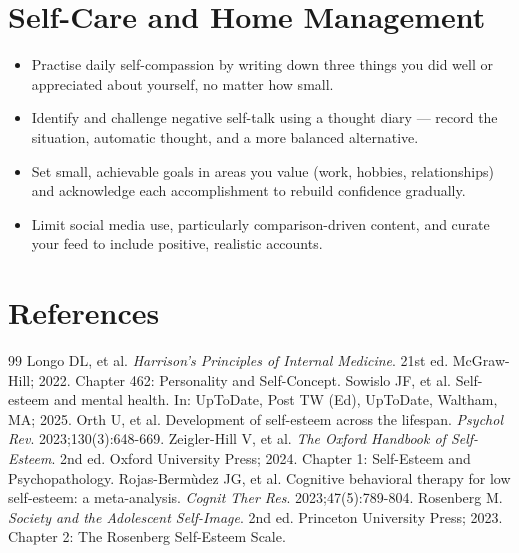\section*{Self-Care and Home Management}
\begin{itemize}
  \item Practise daily self-compassion by writing down three things you did well or appreciated about yourself, no matter how small.
  \item Identify and challenge negative self-talk using a thought diary — record the situation, automatic thought, and a more balanced alternative.
  \item Set small, achievable goals in areas you value (work, hobbies, relationships) and acknowledge each accomplishment to rebuild confidence gradually.
  \item Limit social media use, particularly comparison-driven content, and curate your feed to include positive, realistic accounts.
\end{itemize}

\section*{References}

\begin{thebibliography}{99}
 Longo DL, et al. \emph{Harrison's Principles of Internal Medicine}. 21st ed. McGraw-Hill; 2022. Chapter 462: Personality and Self-Concept.
 Sowislo JF, et al. Self-esteem and mental health. In: UpToDate, Post TW (Ed), UpToDate, Waltham, MA; 2025.
 Orth U, et al. Development of self-esteem across the lifespan. \emph{Psychol Rev}. 2023;130(3):648-669.
 Zeigler-Hill V, et al. \emph{The Oxford Handbook of Self-Esteem}. 2nd ed. Oxford University Press; 2024. Chapter 1: Self-Esteem and Psychopathology.
 Rojas-Berm\`udez JG, et al. Cognitive behavioral therapy for low self-esteem: a meta-analysis. \emph{Cognit Ther Res}. 2023;47(5):789-804.
 Rosenberg M. \emph{Society and the Adolescent Self-Image}. 2nd ed. Princeton University Press; 2023. Chapter 2: The Rosenberg Self-Esteem Scale.
\end{thebibliography}
